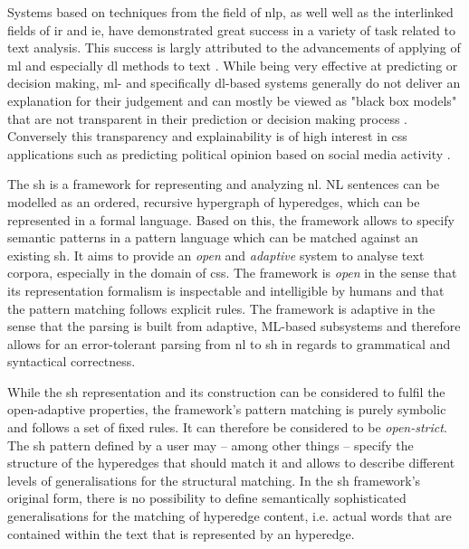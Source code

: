 \documentclass[11pt]{scrreprt}
\let\cite\parencite  %
\begin{document}
Systems based on techniques from the field of \gls{nlp}, as well well as the interlinked fields of \gls{ir} and \gls{ie}, have demonstrated great success in a variety of task related to text analysis. This success is largly attributed to the advancements of applying of \gls{ml}  and especially \gls{dl} methods to text \cite{hirschbergAdvancesNaturalLanguage2015} \cite{qiuPretrainedModelsNatural2020}. While being very effective at predicting or decision making, \gls{ml}- and specifically \gls{dl}-based systems generally do not deliver an explanation for their judgement and can mostly be viewed as "black box models" that are not transparent in their prediction or decision making process \cite{rudinStopExplainingBlack2019}. Conversely this transparency and explainability is of high interest in \gls{css} applications such as predicting political opinion based on social media activity \cite{wilkersonLargeScaleComputerizedText2017}.

The \gls{sh} \cite{menezesSemanticHypergraphs2021} is a framework for representing and analyzing \gls{nl}. NL sentences can be modelled as an ordered, recursive hypergraph of hyperedges, which can be represented in a formal language. Based on this, the framework allows to specify semantic patterns in a pattern language which can be matched against an existing \gls{sh}. It aims to provide an \textit{open} and \textit{adaptive} system to analyse text corpora, especially in the domain of \gls{css}. The framework is \textit{open} in the sense that its representation formalism is inspectable and intelligible by humans and that the pattern matching follows explicit rules. The framework is adaptive in the sense that the parsing is built from adaptive, ML-based subsystems and therefore allows for an error-tolerant parsing from \gls{nl} to \gls{sh} in regards to grammatical and syntactical correctness.

While the \gls{sh} representation and its construction can be considered to fulfil the open-adaptive properties, the framework's pattern matching is purely symbolic and follows a set of fixed rules. It can therefore be considered to be \textit{open-strict}. The \gls{sh} pattern defined by a user may -- among other things -- specify the structure of the hyperedges that should match it and allows  to describe different levels of generalisations for the structural matching. In the \gls{sh} framework's original form, there is no possibility to define semantically sophisticated generalisations for the matching of hyperedge content, i.e. actual words that are contained within the text that is represented by an hyperedge.
\end{document}
